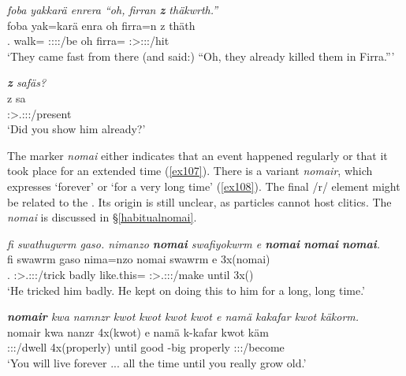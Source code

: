 \begin{exe}
	\ex \emph{foba yakkarä enrera ``oh, firran \textbf{z} thäkwrth.''}\\
	\gll foba yak=karä enra oh firra=n z thäth\\
	{\Dist}.{\Abl} walk={\Prop} \Stpl:\Sbj:\Pst:\Ipfv:\Venit/be oh firra={\Loc} {\Iam} \Stpl:\Sbj>\Stpl:\Obj:\Rpst:\Pfv/hit\\
	\trans `They came fast from there (and said:) ``Oh, they already killed them in Firra.''' 
	\label{ex130}
\end{exe}
\newpage 
\begin{exe}
	\ex \emph{\textbf{z} safäs?}\\
	\gll z sa\\
	{\Iam} \Stsg:\Sbj>\Tsg.\Masc:\Io:\Rpst:\Pfv/present\\
	\trans `Did you show him already?' 
	\label{ex106}
\end{exe}

The  marker \emph{nomai} either indicates that an event happened regularly or that it took place for an extended time (\ref{ex107}). There is a variant \emph{nomair}, which expresses `forever' or `for a very long time' (\ref{ex108}). The final /r/ element might be related to the  . Its origin is still unclear, as particles cannot host  clitics. The   \emph{nomai} is discussed in {\S}\ref{habitualnomai}.

\begin{exe}
	\ex \emph{fi swathugwrm gaso. nimanzo \textbf{nomai} swafiyokwrm e \textbf{nomai} \textbf{nomai} \textbf{nomai}.}\\
	\gll fi swawrm gaso nima=nzo nomai swawrm e 3x(nomai)\\
	\Tsg.{\Abs} \Stsg:\Sbj>\Tsg.\Masc:\Obj:\Pst:\Dur/trick badly {like.this}={\Only} \Hab{} \Stsg:\Sbj>\Tsg.\Masc:\Obj:\Pst:\Dur/make until 3x(\Hab)\\
	\trans `He tricked him badly. He kept on doing this to him for a long, long time.'\\ 
	\label{ex107}
\end{exe}
\begin{exe}
	\ex \emph{\textbf{nomair} kwa namnzr kwot kwot kwot kwot e namä kakafar kwot käkorm.}\\
	\gll nomair kwa nanzr 4x(kwot) e namä k-kafar kwot käm\\
	\Hab{} {\Fut} \Ssg:\Sbj:\Nonpast:\Ipfv/dwell 4x(properly) until good \Redup-big properly \Ssg:\Sbj:\Futimp:\Pfv/become\\
	\trans `You will live forever ... all the time until you really grow old.'\\ 
	\label{ex108}
\end{exe}


